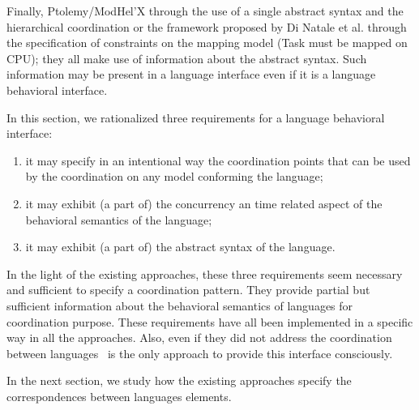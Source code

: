 Finally, Ptolemy/ModHel'X through the use of a single abstract syntax and the hierarchical coordination or the framework proposed by Di Natale et al. through the specification of constraints on the mapping model (\eg Task must be mapped on CPU); they all make use of information about the abstract syntax. Such information may be present in a language interface even if it is a language behavioral interface.

In this section, we rationalized three requirements for a language behavioral interface:
\begin{enumerate}
\item it may specify in an intentional way the coordination points that can be used by the coordination on any model conforming the language;
\item it may exhibit (a part of) the concurrency an time related aspect of the behavioral semantics of the language;
\item it may exhibit (a part of) the abstract syntax of the language.
\end{enumerate}

In the light of the existing approaches, these three requirements seem necessary and sufficient to specify a coordination pattern. They provide partial but sufficient information about the behavioral semantics of languages for coordination purpose.  These requirements have all been implemented in a specific way in all the approaches. Also, even if they did not address the coordination between languages~\cite{sle13-combemale} is the only approach to provide this interface consciously.

In the next section, we study how the existing approaches specify the correspondences between languages elements.	

	    	
	    	
	    				
	    				
	    				
